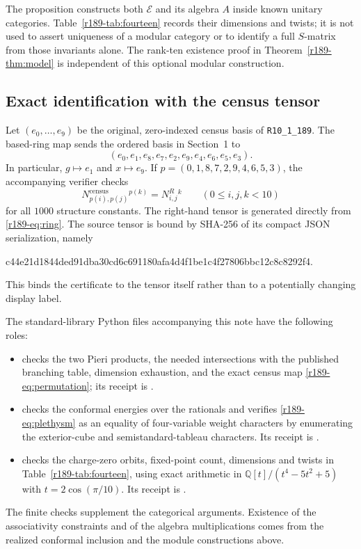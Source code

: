 \begin{remark}
The proposition constructs both $\mathcal{E}$ and its algebra $A$ inside known
unitary categories. Table~\ref{r189-tab:fourteen} records their dimensions
and twists; it is not used to assert uniqueness of a modular category
or to identify a full $S$-matrix from those invariants alone. The
rank-ten existence proof in Theorem~\ref{r189-thm:model} is independent of
this optional modular construction.
\end{remark}


\subsection{Exact identification with the census tensor}
\label{r189-sec:certificate}

Let $(e_0,\ldots,e_9)$ be the original, zero-indexed census basis of
\texttt{R10\_1\_189}. The based-ring map sends the ordered basis in
Section~1 to
\begin{equation}\label{r189-eq:permutation}
 (e_0,e_1,e_8,e_7,e_2,e_9,e_4,e_6,e_5,e_3).
\end{equation}
In particular, $g\mapsto e_1$ and $x\mapsto e_9$. If
$p=(0,1,8,7,2,9,4,6,5,3)$, the accompanying verifier checks
\[
 N^{\mathrm{census}}_{p(i),p(j)}{}^{p(k)}
 =N^{R}_{i,j}{}^k\qquad(0\leq i,j,k<10)
\]
for all $1000$ structure constants. The right-hand tensor is generated
directly from \eqref{r189-eq:ring}. The source tensor is bound by SHA-256
of its compact JSON serialization, namely
\begin{center}
\small\ttfamily
c44e21d1844ded91dba30cd6c691180afa4d4f1be1c4f27806bbc12c8c8292f4.
\end{center}
This binds the certificate to the tensor itself rather than to a
potentially changing display label.

The standard-library Python files accompanying this note have the
following roles:
\begin{itemize}
\item {} checks the two Pieri products,
the needed intersections with the published branching table, dimension
exhaustion, and the exact census map \eqref{r189-eq:permutation}; its receipt
is .
\item {} checks the conformal energies
over the rationals and verifies \eqref{r189-eq:plethysm} as an equality of
four-variable weight characters by enumerating the exterior-cube and
semistandard-tableau characters. Its receipt is
.
\item {} checks the charge-zero orbits,
fixed-point count, dimensions and twists in Table~\ref{r189-tab:fourteen},
using exact arithmetic in
$\mathbb Q[t]/(t^4-5t^2+5)$ with $t=2\cos(\pi/10)$.
Its receipt is .
\end{itemize}
The finite checks supplement the categorical arguments. Existence of
the associativity constraints and of the algebra multiplications comes
from the realized conformal inclusion and the module constructions
above.

